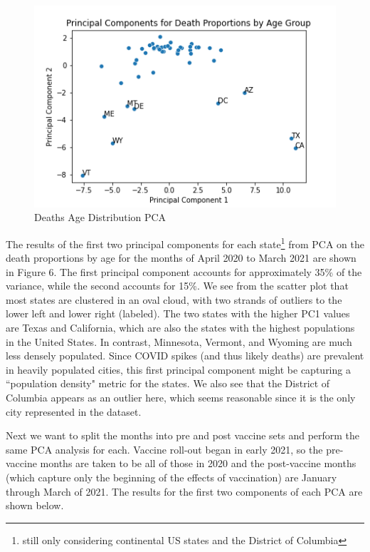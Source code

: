 \documentclass[11pt]{article}
\begin{document}
\begin{figure}
\includegraphics[scale=0.5]{"../figures/initial_death_pca.png"}
\caption{Deaths Age Distribution PCA}
\end{figure}
The results of the first two principal components for each state\footnote{still only considering continental US states and the District of Columbia} from PCA on the death proportions by age for the months of April 2020 to March 2021 are shown in Figure 6. The first principal component accounts for approximately 35\% of the variance, while the second accounts for 15\%. We see from the scatter plot that most states are clustered in an oval cloud, with two strands of outliers to the lower left and lower right (labeled). The two states with the higher PC1 values are Texas and California, which are also the states with the highest populations in the United States. In contrast, Minnesota, Vermont, and Wyoming are much less densely populated. Since COVID spikes (and thus likely deaths) are prevalent in heavily populated cities, this first principal component might be capturing a ``population density" metric for the states. We also see that the District of Columbia appears as an outlier here, which seems reasonable since it is the only city represented in the dataset. 

Next we want to split the months into pre and post vaccine sets and perform the same PCA analysis for each. Vaccine roll-out began in early 2021, so the pre-vaccine months are taken to be all of those in 2020 and the post-vaccine months (which capture only the beginning of the effects of vaccination) are January through March of 2021. The results for the first two components of each PCA are shown below. 
\end{document}
